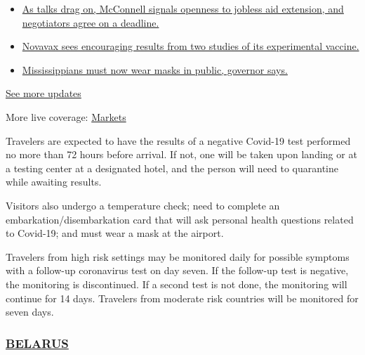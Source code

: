 \begin{itemize}
\tightlist
\item
  \href{https://www.nytimes3xbfgragh.onion/2020/08/04/world/coronavirus-cases.html?action=click\&pgtype=Article\&state=default\&region=MAIN_CONTENT_1\&context=storylines_live_updates\#link-762df92}{As
  talks drag on, McConnell signals openness to jobless aid extension,
  and negotiators agree on a deadline.}
\item
  \href{https://www.nytimes3xbfgragh.onion/2020/08/04/world/coronavirus-cases.html?action=click\&pgtype=Article\&state=default\&region=MAIN_CONTENT_1\&context=storylines_live_updates\#link-1228a480}{Novavax
  sees encouraging results from two studies of its experimental
  vaccine.}
\item
  \href{https://www.nytimes3xbfgragh.onion/2020/08/04/world/coronavirus-cases.html?action=click\&pgtype=Article\&state=default\&region=MAIN_CONTENT_1\&context=storylines_live_updates\#link-794484ed}{Mississippians
  must now wear masks in public, governor says.}
\end{itemize}

\href{https://www.nytimes3xbfgragh.onion/2020/08/04/world/coronavirus-cases.html?action=click\&pgtype=Article\&state=default\&region=MAIN_CONTENT_1\&context=storylines_live_updates}{See
more updates}

More live coverage:
\href{https://www.nytimes3xbfgragh.onion/live/2020/08/04/business/stock-market-today-coronavirus?action=click\&pgtype=Article\&state=default\&region=MAIN_CONTENT_1\&context=storylines_live_updates}{Markets}

Travelers are expected to have the results of a negative Covid-19 test
performed no more than 72 hours before arrival. If not, one will be
taken upon landing or at a testing center at a designated hotel, and the
person will need to quarantine while awaiting results.

Visitors also undergo a temperature check; need to complete an
embarkation/disembarkation card that will ask personal health questions
related to Covid-19; and must wear a mask at the airport.

Travelers from high risk settings may be monitored daily for possible
symptoms with a follow-up coronavirus test on day seven. If the
follow-up test is negative, the monitoring is discontinued. If a second
test is not done, the monitoring will continue for 14 days. Travelers
from moderate risk countries will be monitored for seven days.

\hypertarget{belarus}{%
\subsubsection{\texorpdfstring{\href{https://by.usembassy.gov/u-s-citizen-services/covid-19-information/}{BELARUS}}{BELARUS}}\label{belarus}}


